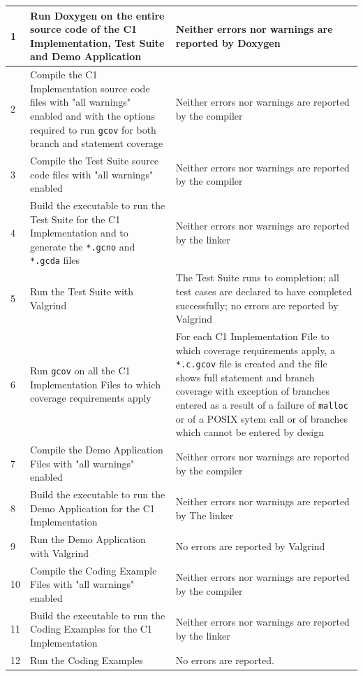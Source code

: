 \documentclass[a4paper,10pt]{article}
\begin{document}
\begin{longtable}{|l|p{5.2cm}|p{5.2cm}|}
1 & Run Doxygen on the entire source code of the C1 Implementation, Test Suite and Demo Application &
Neither errors nor warnings are reported by Doxygen \\
\hline
2 & Compile the C1 Implementation source code files with "all warnings" enabled and with the options required to run \texttt{gcov} for both branch and statement coverage &
Neither errors nor warnings are reported by the compiler \\
\hline
3 & Compile the Test Suite source code files with "all warnings" enabled &
Neither errors nor warnings are reported by the compiler \\
\hline
4 & Build the executable to run the Test Suite for the C1 Implementation and to generate the \texttt{*.gcno} and \texttt{*.gcda} files &
Neither errors nor warnings are reported by the linker \\
\hline
5 & Run the Test Suite with Valgrind &
The Test Suite runs to completion; all test cases are declared to have completed successfully; no errors are reported by Valgrind \\
\hline
6 & Run \texttt{gcov} on all the C1 Implementation Files to which coverage requirements apply &
For each C1 Implementation File to which coverage requirements apply, a \texttt{*.c.gcov}
file is created and the file shows full statement and branch coverage with exception of
branches entered as a result of a failure of \texttt{malloc} or of a POSIX sytem call or of branches which cannot be entered by design \\
\hline
7 & Compile the Demo Application Files with "all warnings" enabled &
Neither errors nor warnings are reported by the compiler \\
\hline
8 & Build the executable to run the Demo Application for the C1 Implementation &
Neither errors nor warnings are reported by The linker \\
\hline
9 & Run the Demo Application with Valgrind &
No errors are reported by Valgrind \\
10 & Compile the Coding Example Files with "all warnings" enabled &
Neither errors nor warnings are reported by the compiler \\
\hline
11 & Build the executable to run the Coding Examples for the C1 Implementation &
Neither errors nor warnings are reported by the linker \\
\hline
12 & Run the Coding Examples &
No errors are reported. \\
\hline
\end{longtable}
\end{document}
